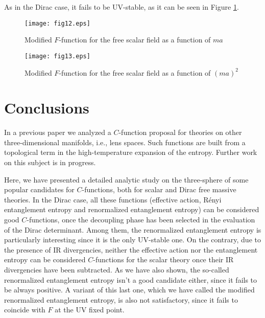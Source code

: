 \documentclass[12pt,a4paper]{article}
\numberwithin{equation}{section}
\begin{document}
As in the Dirac case, it fails to be UV-stable, as it can be seen in Figure \ref{figure11}.

\begin{figure}[h]
	\centering
	\begin{minipage}{.4\textwidth}
		\centering
		\texttt{[image: fig12.eps]}
		\caption{\small Modified $F$-function for the free scalar field as a function of $ma$}
		\label{figure10}
	\end{minipage}
	\hspace{0.02\textwidth}
	\begin{minipage}{.4\textwidth}
		\centering
		\texttt{[image: fig13.eps]}
		\caption{\small Modified $F$-function for the free scalar field as a function of ${(ma)}^2$}
		\label{figure11}
	\end{minipage}
\end{figure}


\section {Conclusions}

In a previous paper \cite{Asorey:2014gsa} we analyzed a $C$-function proposal for theories on other three-dimensional manifolds, i.e., lens spaces. Such functions are built from a topological term in the high-temperature expansion of the entropy. Further work on this subject is in progress.

Here, we have presented a detailed analytic study on the three-sphere of some popular candidates for $C$-functions, both for scalar and Dirac free massive theories. In the Dirac case, all these functions (effective action, R\'enyi entanglement entropy and renormalized entanglement entropy) can be considered good $C$-functions, once the decoupling phase has been selected in the evaluation of the Dirac determinant. Among them, the renormalized entanglement entropy is particularly interesting since it is the only UV-stable one. On the contrary, due to the presence of IR divergencies, neither the effective action nor the entanglement entropy can be considered $C$-functions for the scalar theory once their IR divergencies have been subtracted. As we have also shown, the so-called renormalized entanglement entropy isn't a good candidate either, since it fails to be always positive. A variant of this last one, which we have called the modified renormalized entanglement entropy, is also not satisfactory, since it fails to coincide with $F$ at the UV fixed point.
\end{document}
